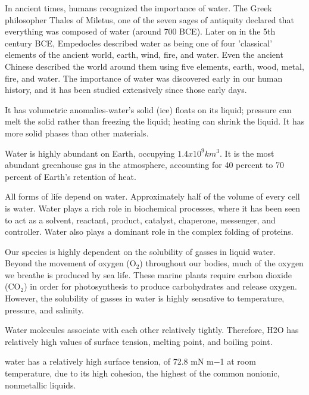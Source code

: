 In ancient times, humans recognized the importance of water. The Greek
philosopher Thales of Miletus, one of the seven sages of antiquity
declared that everything was composed of water (around 700 BCE). Later
on in the 5th century BCE, Empedocles described water as being one of
four 'classical' elements of the ancient world, earth, wind, fire, and
water. Even the ancient Chinese described the world around them using
five elements, earth, wood, metal, fire, and water. The importance of
water was discovered early in our human history, and it has been
studied extensively since those early days.  

It has volumetric anomalies-water’s solid (ice) floats on its liquid;
pressure can melt the solid rather than freezing the liquid; heating
can shrink the liquid. It has more solid phases than other materials.

Water is highly abundant on Earth, occupying
$1.4x10^{9} km^{3}$.\cite{2-4} It is the most abundant greenhouse gas
in the atmosphere, accounting for 40 percent to 70 percent of Earth's
retention of heat.

All forms of life depend on water.\cite{5,6} Approximately half of the
volume of every cell is water.\cite{7} Water plays a rich role in
biochemical processes, where it has been seen to act as a solvent,
reactant, product, catalyst, chaperone, messenger, and
controller. Water also plays a dominant role in the complex folding of
proteins.

Our species is highly dependent on the solubility of gasses in liquid
water. Beyond the movement of oxygen (O$_{2}$) throughout
our bodies, much of the oxygen we breathe is produced by sea
life. These marine plants require carbon dioxide
(CO$_{2}$) in order for photosynthesis to produce
carbohydrates and release oxygen. However, the solubility of gasses in
water is highly sensative to temperature, pressure, and salinity. 

Water molecules associate with each other relatively
tightly. Therefore, H2O has relatively high values of surface tension,
melting point, and boiling point.

water has a relatively high surface tension, of 72.8 mN m−1 at room
temperature, due to its high cohesion, the highest of the common
nonionic, nonmetallic liquids.

